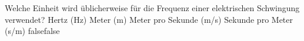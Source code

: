     {Welche Einheit wird üblicherweise für die Frequenz einer elektrischen Schwingung verwendet?}
    {Hertz (Hz)}
    {Meter (m)}
    {Meter pro Sekunde (m/s)}
    {Sekunde pro Meter (s/m)}
    {false}{false}